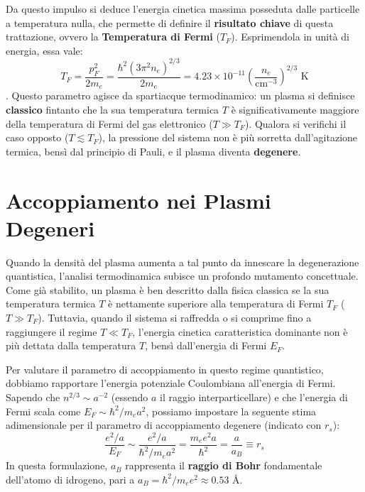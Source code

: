 Da questo impulso si deduce l'energia cinetica massima posseduta dalle particelle a temperatura nulla, che permette di definire il \textbf{risultato chiave} di questa trattazione, ovvero la \textbf{Temperatura di Fermi} ($T_F$). Esprimendola in unità di energia, essa vale:
\begin{equation}
T_F = \frac{p_F^2}{2m_e} = \frac{\hbar^2 (3\pi^2 n_e)^{2/3}}{2m_e} = 4.23 \times 10^{-11} \left( \frac{n_e}{\text{cm}^{-3}} \right)^{2/3} \text{ K}
\end{equation}
.
Questo parametro agisce da spartiacque termodinamico: un plasma si definisce \textbf{classico} fintanto che la sua temperatura termica $T$ è significativamente maggiore della temperatura di Fermi del gas elettronico ($T \gg T_F$). Qualora si verifichi il caso opposto ($T \lesssim T_F$), la pressione del sistema non è più sorretta dall'agitazione termica, bensì dal principio di Pauli, e il plasma diventa \textbf{degenere}.

\section{Accoppiamento nei Plasmi Degeneri}

Quando la densità del plasma aumenta a tal punto da innescare la degenerazione quantistica, l'analisi termodinamica subisce un profondo mutamento concettuale. Come già stabilito, un plasma è ben descritto dalla fisica classica se la sua temperatura termica $T$ è nettamente superiore alla temperatura di Fermi $T_F$ ($T \gg T_F$). Tuttavia, quando il sistema si raffredda o si comprime fino a raggiungere il regime $T \ll T_F$, l'energia cinetica caratteristica dominante non è più dettata dalla temperatura $T$, bensì dall'energia di Fermi $E_F$.

Per valutare il parametro di accoppiamento in questo regime quantistico, dobbiamo rapportare l'energia potenziale Coulombiana all'energia di Fermi. Sapendo che $n^{2/3} \sim a^{-2}$ (essendo $a$ il raggio interparticellare) e che l'energia di Fermi scala come $E_F \sim \hbar^2 / m_e a^2$, possiamo impostare la seguente stima adimensionale per il parametro di accoppiamento degenere (indicato con $r_s$):
\begin{equation}
\frac{e^2/a}{E_F} \sim \frac{e^2/a}{\hbar^2 / m_e a^2} = \frac{m_e e^2 a}{\hbar^2} = \frac{a}{a_B} \equiv r_s
\end{equation}
In questa formulazione, $a_B$ rappresenta il \textbf{raggio di Bohr} fondamentale dell'atomo di idrogeno, pari a $a_B = \hbar^2 / m_e e^2 \approx 0.53 \text{ \AA}$.

